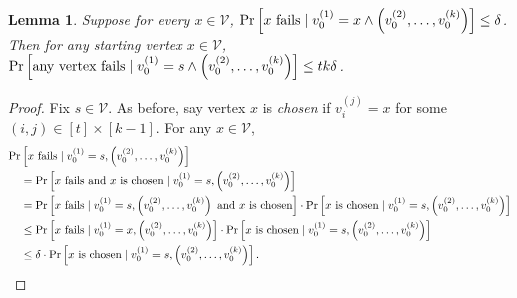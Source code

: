\documentclass{report}
\newtheorem{lemma}[theorem]{Lemma}
\begin{document}
\begin{lemma} \label{lem:rw:startbound}
Suppose for every $x \in \mathcal{V}$, $\Pr \left [\textnormal{$x$ fails} \mid v_0^{(1)} = x \wedge \left (v_0^{(2)}, \dots, v_0^{(k)} \right ) \right ] \leq \delta$.
Then for any starting vertex $x \in \mathcal{V}$, $\Pr \left [\textnormal{any vertex fails} \mid v_0^{(1)} = s \wedge \left (v_0^{(2)}, \dots, v_0^{(k)} \right ) \right ] \leq tk\delta$.
\end{lemma}
%
\begin{proof}
Fix $s \in \mathcal{V}$.
As before, say vertex $x$ is \emph{chosen} if $v_i^{(j)} = x$ for some $(i, j) \in [t] \times [k-1]$.
For any $x \in \mathcal{V}$, 
%
\begin{align}
\nonumber
\Pr& \left [ \textnormal{$x$ fails} \mid v_0^{(1)} = s, \left (v_0^{(2)}, \dots, v_0^{(k)} \right ) \right ]
\\
\nonumber
&=
\Pr \left [ \textnormal{$x$ fails and $x$ is chosen} \mid v_0^{(1)} = s, \left (v_0^{(2)}, \dots, v_0^{(k)} \right ) \right ]
\\
\nonumber
&=
\Pr \left [ \textnormal{$x$ fails} \mid v_0^{(1)} = s, \left (v_0^{(2)}, \dots, v_0^{(k)} \right ) \textnormal{ and $x$ is chosen} \right ] \cdot
\Pr \left [ \textnormal{$x$ is chosen} \mid v_0^{(1)} = s, \left (v_0^{(2)}, \dots, v_0^{(k)} \right ) \right ]
\\
\nonumber
&\leq
\Pr \left [ \textnormal{$x$ fails} \mid v_0^{(1)} = x, \left (v_0^{(2)}, \dots, v_0^{(k)} \right ) \right ] \cdot
\Pr \left [ \textnormal{$x$ is chosen} \mid v_0^{(1)} = s, \left (v_0^{(2)}, \dots, v_0^{(k)} \right ) \right ]
\\
\label{eq:rw:sample:fail:prob}
&\leq
\delta \cdot
\Pr \left [ \textnormal{$x$ is chosen} \mid v_0^{(1)} = s, \left (v_0^{(2)}, \dots, v_0^{(k)} \right ) \right ].
\end{align}
%


\end{proof}
\end{document}
